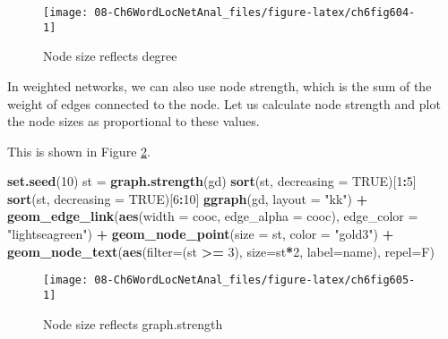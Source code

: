 \documentclass[
]{article}
\newenvironment{Shaded}{\begin{snugshade}}{\end{snugshade}}
\newcommand{\AttributeTok}[1]{\textcolor[rgb]{0.13,0.29,0.53}{#1}}
\newcommand{\ConstantTok}[1]{\textcolor[rgb]{0.56,0.35,0.01}{#1}}
\newcommand{\DecValTok}[1]{\textcolor[rgb]{0.00,0.00,0.81}{#1}}
\newcommand{\FunctionTok}[1]{\textcolor[rgb]{0.13,0.29,0.53}{\textbf{#1}}}
\newcommand{\NormalTok}[1]{#1}
\newcommand{\OtherTok}[1]{\textcolor[rgb]{0.56,0.35,0.01}{#1}}
\newcommand{\SpecialCharTok}[1]{\textcolor[rgb]{0.81,0.36,0.00}{\textbf{#1}}}
\newcommand{\StringTok}[1]{\textcolor[rgb]{0.31,0.60,0.02}{#1}}
\begin{document}
\begin{figure}

{\centering \texttt{[image: 08-Ch6WordLocNetAnal\_files/figure-latex/ch6fig604-1]} 

}

\caption{Node size reflects degree}\label{fig:ch6fig604}
\end{figure}

In weighted networks, we can also use node strength, which is the sum of the weight of edges connected to the node. Let us calculate node strength and plot the node sizes as proportional to these values.

This is shown in Figure \ref{fig:ch6fig605}.

\begin{Shaded}
\begin{Highlighting}[]
\FunctionTok{set.seed}\NormalTok{(}\DecValTok{10}\NormalTok{)}
\NormalTok{st }\OtherTok{=} \FunctionTok{graph.strength}\NormalTok{(gd)}
\FunctionTok{sort}\NormalTok{(st, }\AttributeTok{decreasing =} \ConstantTok{TRUE}\NormalTok{)[}\DecValTok{1}\SpecialCharTok{:}\DecValTok{5}\NormalTok{]}
\FunctionTok{sort}\NormalTok{(st, }\AttributeTok{decreasing =} \ConstantTok{TRUE}\NormalTok{)[}\DecValTok{6}\SpecialCharTok{:}\DecValTok{10}\NormalTok{]}
\FunctionTok{ggraph}\NormalTok{(gd, }\AttributeTok{layout =} \StringTok{"kk"}\NormalTok{) }\SpecialCharTok{+}
  \FunctionTok{geom\_edge\_link}\NormalTok{(}\FunctionTok{aes}\NormalTok{(}\AttributeTok{width =}\NormalTok{ cooc, }\AttributeTok{edge\_alpha =}\NormalTok{ cooc), }
                 \AttributeTok{edge\_color =} \StringTok{"lightseagreen"}\NormalTok{) }\SpecialCharTok{+}
  \FunctionTok{geom\_node\_point}\NormalTok{(}\AttributeTok{size =}\NormalTok{ st, }\AttributeTok{color =} \StringTok{"gold3"}\NormalTok{) }\SpecialCharTok{+}
  \FunctionTok{geom\_node\_text}\NormalTok{(}\FunctionTok{aes}\NormalTok{(}\AttributeTok{filter=}\NormalTok{(st }\SpecialCharTok{\textgreater{}=} \DecValTok{3}\NormalTok{), }\AttributeTok{size=}\NormalTok{st}\SpecialCharTok{*}\DecValTok{2}\NormalTok{, }\AttributeTok{label=}\NormalTok{name), }\AttributeTok{repel=}\NormalTok{F)}
\end{Highlighting}
\end{Shaded}

\begin{figure}

{\centering \texttt{[image: 08-Ch6WordLocNetAnal\_files/figure-latex/ch6fig605-1]} 

}

\caption{Node size reflects graph.strength}\label{fig:ch6fig605}
\end{figure}
\end{document}
